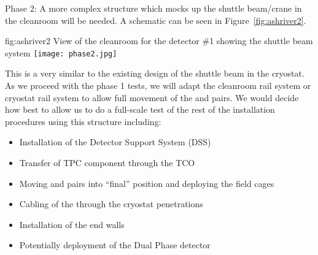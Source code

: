 Phase 2: A more complex structure which mocks up the shuttle
beam/crane in the cleanroom will be needed. A schematic can be seen in
Figure~\ref{fig:ashriver2}.
\begin{dunefigure}{fig:ashriver2}
  {View of the cleanroom for the  detector \#1 showing the
    shuttle beam system}
  \texttt{[image: phase2.jpg]}
\end{dunefigure}
This is a very similar to the existing design of the shuttle beam in
the cryostat.  As we proceed with the phase 1 tests, we will adapt the
cleanroom rail system or cryostat rail system to allow full movement
of the  and  pairs. We would decide how best to
allow us to do a full-scale test of the rest of the installation
procedures using this structure including:
\begin{itemize}
 \item Installation of the Detector Support System (DSS)
 \item Transfer of TPC component through the TCO
 \item Moving  and  pairs into ``final'' position and deploying the field cages
 \item Cabling of the  through the cryostat penetrations
 \item Installation of the end walls
 \item Potentially deployment of the Dual Phase detector
\end{itemize}
